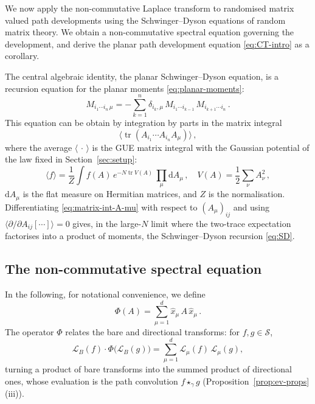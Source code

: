 \documentclass[11pt,a4paper]{article}
\DeclareMathOperator{\tr}{tr}
\newcommand{\xh}{\hat{x}}
\newcommand{\cL}{\mathcal{L}}
\newcommand{\dd}{\mathrm{d}}
\begin{document}
We now apply the non-commutative Laplace transform to randomised matrix valued path developments using the Schwinger--Dyson equations of random matrix theory. We obtain a non-commutative spectral equation governing the development, and derive the planar path development equation \eqref{eq:CT-intro} as a corollary.


The central algebraic identity, the planar Schwinger--Dyson equation, is a recursion equation for the planar moments \eqref{eq:planar-moments}:
\begin{equation}\label{eq:SD}
  M_{i_1\cdots i_n\,\mu} = -\sum_{k=1}^{n}\delta_{i_k,\mu}\,M_{i_1\cdots i_{k-1}}\,M_{i_{k+1}\cdots i_n}\,.
\end{equation}
%
This equation can be obtain by integration by parts in the matrix integral
%
\begin{equation}\label{eq:matrix-int-A-mu}
    \langle\tr(A_{i_1}\cdots A_{i_n}A_\mu)\rangle\,,
\end{equation}
%
where the average $\langle\,\cdot\,\rangle$ is the GUE matrix integral with the Gaussian potential of the law fixed in Section~\ref{sec:setup}:
%
\begin{equation}\label{eq:GUE-average}
\langle f\rangle = \frac{1}{Z}\int f(A)\,e^{-N\tr V(A)}\,\prod_\mu\dd A_\mu\,,\quad V(A)=\frac{1}{2}\sum_\nu A_\nu^2\,,
\end{equation}
%
$\dd A_\mu$ is the flat measure on Hermitian matrices, and $Z$ is the normalisation. Differentiating \eqref{eq:matrix-int-A-mu} with respect to $(A_\mu)_{ij}$ and using $\langle\partial/\partial A_{ij}[\cdots]\rangle=0$ gives, in the large-$N$ limit where the two-trace expectation factorises into a product of moments, the Schwinger–Dyson recursion \eqref{eq:SD}.




\subsection{The non-commutative spectral equation}\label{sec:nc-spectral}

In the following, for notational convenience, we define  
\begin{equation}\label{eq:def-Phi}
\Phi(A) = \sum_{\mu=1}^d \xh_\mu\,A\,\xh_\mu\,.
\end{equation}
%
The operator $\Phi$ relates the bare and directional transforms: for $f,g\in\mathcal S$,
\begin{equation*}
  \cL_B(f)\cdot\Phi\bigl(\cL_B(g)\bigr)
  = \sum_{\mu=1}^d \cL_\mu(f)\,\cL_\mu(g),
\end{equation*}
turning a product of bare transforms into the summed product of directional ones, whose evaluation is the path convolution $f\star_\gamma g$ (Proposition~\ref{prop:ev-props}(iii)).
\end{document}
